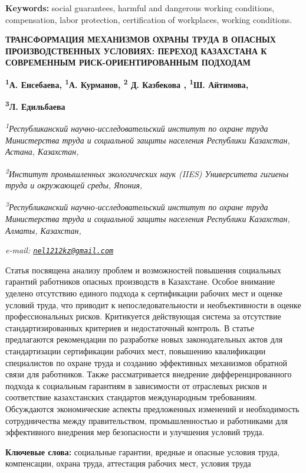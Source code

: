 {\bfseries Keywords:} social guarantees, harmful and dangerous working
conditions, compensation, labor protection, certification of workplaces,
working conditions.

{\bfseries ТРАНСФОРМАЦИЯ МЕХАНИЗМОВ ОХРАНЫ ТРУДА В ОПАСНЫХ ПРОИЗВОДСТВЕННЫХ
УСЛОВИЯХ: ПЕРЕХОД КАЗАХСТАНА К СОВРЕМЕННЫМ РИСК-ОРИЕНТИРОВАННЫМ
ПОДХОДАМ}

{\bfseries \textsuperscript{1}А. Енсебаева\textsuperscript{\envelope },
\textsuperscript{1}А. Курманов, \textsuperscript{2} Д. Казбекова ,
\textsuperscript{1}Ш. Айтимова,}

{\bfseries \textsuperscript{3}Л. Едильбаева}

\emph{\textsuperscript{1}Республиканский научно-исследовательский
институт по охране труда Министерства труда и социальной защиты
населения Республики Казахстан, Астана, Казахстан,}

\emph{\textsuperscript{2}Институт промышленных экологических наук (IIES)
Университета гигиены труда и окружающей среды, Япония,}

\emph{\textsuperscript{3}Республиканский научно-исследовательский
институт по охране труда Министерства труда и социальной защиты
населения Республики Казахстан, Алматы, Казахстан,}

\emph{e-mail:
\href{mailto:nel1212kz@gmail.com}{\nolinkurl{nel1212kz@gmail.com}}}

Статья посвящена анализу проблем и возможностей повышения социальных
гарантий работников опасных производств в Казахстане. Особое внимание
уделено отсутствию единого подхода к сертификации рабочих мест и оценке
условий труда, что приводит к непоследовательности и необъективности в
оценке профессиональных рисков. Критикуется действующая система за
отсутствие стандартизированных критериев и недостаточный контроль. В
статье предлагаются рекомендации по разработке новых законодательных
актов для стандартизации сертификации рабочих мест, повышению
квалификации специалистов по охране труда и созданию эффективных
механизмов обратной связи для работников. Также рассматривается
внедрение дифференцированного подхода к социальным гарантиям в
зависимости от отраслевых рисков и соответствие казахстанских стандартов
международным требованиям. Обсуждаются экономические аспекты
предложенных изменений и необходимость сотрудничества между
правительством, промышленностью и работниками для эффективного внедрения
мер безопасности и улучшения условий труда.

{\bfseries Ключевые слова:} социальные гарантии, вредные и опасные условия
труда, компенсации, охрана труда, аттестация рабочих мест, условия труда

